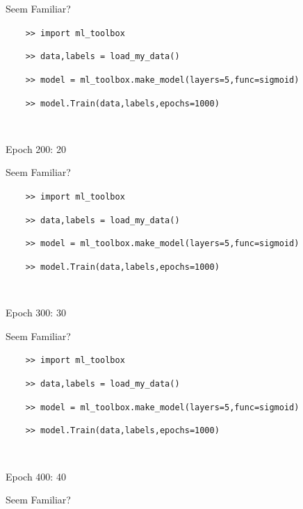\documentclass[]{SangerLibrary/sanger-present}
\begin{document}
{\begin{frame}[fragile]{\color{computer}Seem Familiar?}
			{\color{computer}
			\verb|    >> import ml_toolbox|\par\par
			\verb|    >> data,labels = load_my_data()|\par\par
			\verb|    >> model = ml_toolbox.make_model(layers=5,func=sigmoid)|\par\par
			\verb|    >> model.Train(data,labels,epochs=1000)|\par~\par
			\verb@    Epoch 200: 20%|xxxx            | [200/1000 12it/s, loss = 3.4]@\par~\par~
			}
		\end{frame}
		\begin{frame}[fragile]{\color{computer}Seem Familiar?}
			
			{\color{computer}
			\verb|    >> import ml_toolbox|\par\par
			\verb|    >> data,labels = load_my_data()|\par\par
			\verb|    >> model = ml_toolbox.make_model(layers=5,func=sigmoid)|\par\par
			\verb|    >> model.Train(data,labels,epochs=1000)|\par~\par
			\verb@    Epoch 300: 30%|xxxxxx          | [300/1000 9it/s, loss = 3.1]@\par~\par~
			}
		\end{frame}
		\begin{frame}[fragile]{\color{computer}Seem Familiar?}
			
			{\color{computer}
			\verb|    >> import ml_toolbox|\par\par
			\verb|    >> data,labels = load_my_data()|\par\par
			\verb|    >> model = ml_toolbox.make_model(layers=5,func=sigmoid)|\par\par
			\verb|    >> model.Train(data,labels,epochs=1000)|\par~\par
			\verb@    Epoch 400: 40%|xxxxxx          | [400/1000 16it/s, loss = 2.9]@\par~\par~
			}
		\end{frame}
		\begin{frame}[fragile]{\color{computer}Seem Familiar?}
			

\end{frame}}
\end{document}

